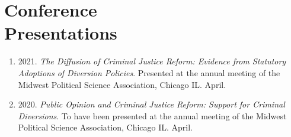 \documentclass[margin,line,pifont,palatino,courier]{res}
\begin{document}
\begin{resume}
\begin{enumerate}
\end{enumerate}








\section{\sc Conference \\ Presentations}

\begin{enumerate}

\item 2021. \emph{The Diffusion of Criminal Justice Reform: Evidence
    from Statutory Adoptions of Diversion Policies}. Presented at
  the annual meeting of the Midwest Political Science Association,
  Chicago IL. April.

\item 2020. \emph{Public Opinion and Criminal Justice Reform: Support for
  Criminal Diversions}. To have been presented at the annual meeting of
the Midwest Political Science Association, Chicago IL. April.


\end{enumerate}
\end{resume}
\end{document}
